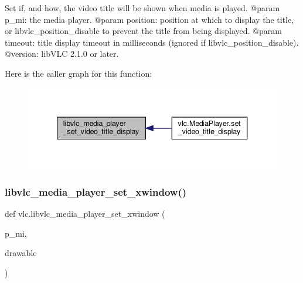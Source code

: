 \begin{DoxyVerb}Set if, and how, the video title will be shown when media is played.
@param p_mi: the media player.
@param position: position at which to display the title, or libvlc_position_disable to prevent the title from being displayed.
@param timeout: title display timeout in milliseconds (ignored if libvlc_position_disable).
@version: libVLC 2.1.0 or later.
\end{DoxyVerb}
 Here is the caller graph for this function\+:
\nopagebreak
\begin{figure}[H]
\begin{center}
\leavevmode
\includegraphics[width=340pt]{namespacevlc_a9dd5dd28c47ef1630ebf1c9da682eed2_icgraph}
\end{center}
\end{figure}
\mbox{\label{namespacevlc_a9f137196660c7428467e8275ebebe8b6}} 
\subsubsection{\texorpdfstring{libvlc\+\_\+media\+\_\+player\+\_\+set\+\_\+xwindow()}{libvlc\_media\_player\_set\_xwindow()}}
{\footnotesize\ttfamily def vlc.\+libvlc\+\_\+media\+\_\+player\+\_\+set\+\_\+xwindow (\begin{DoxyParamCaption}\item[{}]{p\+\_\+mi,  }\item[{}]{drawable }\end{DoxyParamCaption})}

